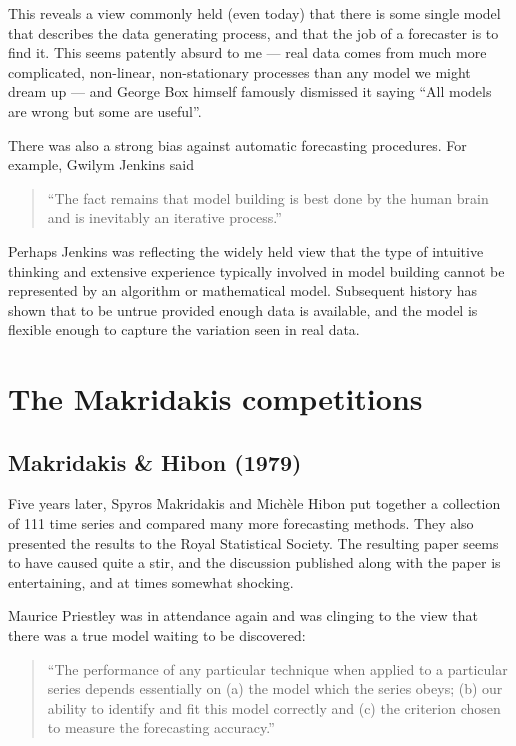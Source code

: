 \documentclass[11pt,a4paper,]{article}
\begin{document}
This reveals a view commonly held (even today) that there is some single model that describes the data generating process, and that the job of a forecaster is to find it. This seems patently absurd to me --- real data comes from much more complicated, non-linear, non-stationary processes than any model we might dream up --- and George Box himself famously dismissed it saying ``All models are wrong but some are useful''.

There was also a strong bias against automatic forecasting procedures. For example, Gwilym Jenkins said

\begin{quote}
``The fact remains that model building is best done by the human brain and is inevitably an iterative process.''
\end{quote}

Perhaps Jenkins was reflecting the widely held view that the type of intuitive thinking and extensive experience typically involved in model building cannot be represented by an algorithm or mathematical model. Subsequent history has shown that to be untrue provided enough data is available, and the model is flexible enough to capture the variation seen in real data.

\hypertarget{sec:makridakis}{%
\section{The Makridakis competitions}\label{sec:makridakis}}

\hypertarget{makridakis-hibon-1979}{%
\subsection*{Makridakis \& Hibon (1979)}\label{makridakis-hibon-1979}}

Five years later, Spyros Makridakis and Michèle Hibon put together a collection of 111 time series and compared many more forecasting methods. They also presented the results to the Royal Statistical Society. The resulting paper \autocite{Makridakis1979} seems to have caused quite a stir, and the discussion published along with the paper is entertaining, and at times somewhat shocking.

Maurice Priestley was in attendance again and was clinging to the view that there was a true model waiting to be discovered:

\begin{quote}
``The performance of any particular technique when applied to a particular series depends essentially on (a) the model which the series obeys; (b) our ability to identify and fit this model correctly and (c) the criterion chosen to measure the forecasting accuracy.''
\end{quote}
\end{document}
